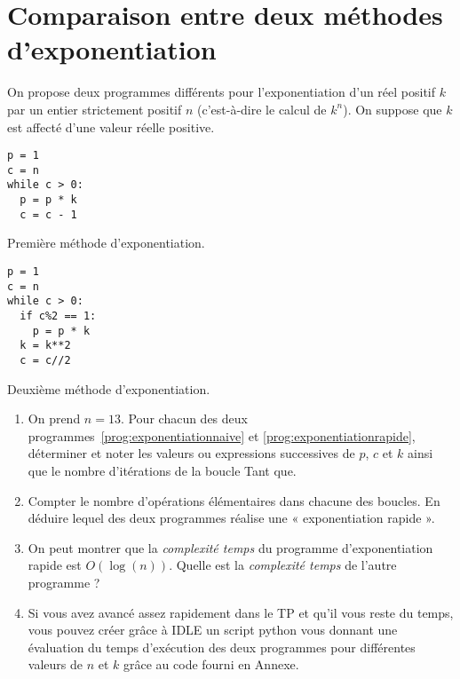 \section{Comparaison entre deux méthodes d'exponentiation}
\label{sec:ComparaisonExponentiation}

On propose deux programmes différents pour l'exponentiation d'un réel positif $k$ par un entier strictement positif $n$ (c'est-à-dire le calcul de $k^n$). On suppose que $k$ est affecté d'une valeur réelle positive.

\begin{listing}[!h]
\begin{verbatim}
p = 1
c = n
while c > 0:
  p = p * k
  c = c - 1
\end{verbatim}
\caption{Première méthode d'exponentiation.}
\label{prog:exponentiationnaive}
\end{listing}

\begin{listing}[!h]
\begin{verbatim}
p = 1
c = n
while c > 0:
  if c%2 == 1:
    p = p * k
  k = k**2  
  c = c//2
\end{verbatim}
\caption{Deuxième méthode d'exponentiation.}
\label{prog:exponentiationrapide}
\end{listing}

\begin{enumerate}

\item On prend $n=13$. Pour chacun des deux programmes~\ref{prog:exponentiationnaive} et \ref{prog:exponentiationrapide}, déterminer et noter les valeurs ou expressions successives de $p$, $c$ et $k$ ainsi que le nombre d'itérations de la boucle Tant que.  

\item Compter le nombre d'opérations élémentaires dans chacune des boucles. En déduire lequel des deux programmes réalise une « exponentiation rapide ». 

\item On peut montrer que la \textit{complexité temps} du programme d'exponentiation rapide est $O(\log(n))$. Quelle est la \textit{complexité temps} de l'autre programme ?

\item Si vous avez avancé assez rapidement dans le TP et qu'il vous reste du temps, vous pouvez créer grâce à IDLE un script python vous donnant une évaluation du temps d'exécution des deux programmes pour différentes valeurs de $n$ et $k$ grâce au code fourni en Annexe.

\end{enumerate}

